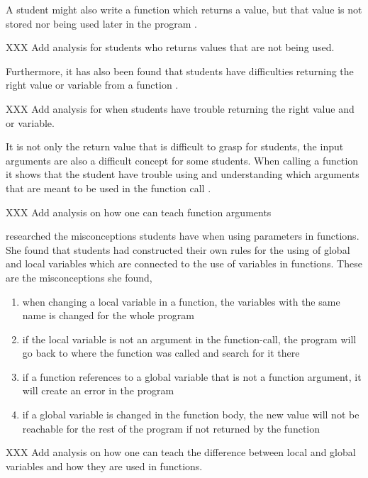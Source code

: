 A student might also write a function which returns a value, but that value is 
not stored nor being used later in the program 
\parencite{AltadmriBrown2015}. 

XXX Add analysis for students who returns values that are not being used. 


Furthermore, it has also been found that students have difficulties returning 
the right value or variable from a function 
\parencite{KumarVeerasamy2016}. 

XXX Add analysis for when students have trouble returning the right value and 
or variable. 



It is not only the return value that is difficult to grasp for students, the 
input arguments are also a difficult concept for some students. When calling a 
function it shows that the student have trouble using and understanding which 
arguments that are meant to be used in the function call 
\parencite{AltadmriBrown2015}. 

XXX Add analysis on how one can teach function arguments 

\Textcite{Fleury1991} researched the 
misconceptions students have when using parameters in functions.
She found that students had constructed their own rules for the using 
of global and local variables which are connected to the use of variables in 
functions. These are the misconceptions she found, 

\begin{enumerate}
    \item when changing a local variable in a function, the variables with 
the same name is changed for the whole program

    \item if the local variable is not an argument in the function-call, the 
program will go back to where the function was called and search for it 
there

    \item if a function references to a global variable that is not a 
function argument, it will create an error in the program

    \item if a global variable is changed in the function body, the new value 
will not be reachable for the rest of the program if not returned by the 
function
\end{enumerate}

XXX Add analysis on how one can teach the difference between local and global 
variables and how they are used in functions. 

